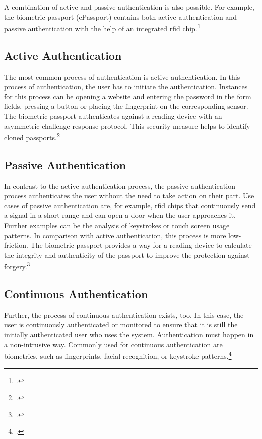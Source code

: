 A combination of active and passive authentication is also possible. For example, the biometric passport (\frqq ePassport\flqq) contains both active authentication and passive authentication with the help of an integrated \gls{rfid} chip.\footcite[See][545]{eckert-it-sec-9}


\subsection{Active Authentication}
\label{subsec:active_auth}

The most common process of authentication is active authentication. In this process of authentication, the user has to initiate the authentication. Instances for this process can be opening a website and entering the password in the form fields, pressing a button or placing the fingerprint on the corresponding sensor. The biometric passport authenticates against a reading device with an asymmetric challenge-response protocol. This security measure helps to identify cloned passports.\footcites[See][185--186]{10.1007/978-3-319-05452-0_14} [See][545]{eckert-it-sec-9}

\subsection{Passive Authentication}

In contrast to the active authentication process, the passive authentication process authenticates the user without the need to take action on their part. Use cases of passive authentication are, for example, \gls{rfid} chips that continuously send a signal in a short-range and can open a door when the user approaches it. Further examples can be the analysis of keystrokes or touch screen usage patterns. In comparison with active authentication, this process is more low-friction. The biometric passport provides a way for a reading device to calculate the integrity and authenticity of the passport to improve the protection against forgery.\footcites[See][186]{10.1007/978-3-319-05452-0_14}[See][]{185306}[See][545]{eckert-it-sec-9}

\subsection{Continuous Authentication}

Further, the process of continuous authentication exists, too. In this case, the user is continuously authenticated or monitored to ensure that it is still the initially authenticated user who uses the system. Authentication must happen in a non-intrusive way. Commonly used for continuous authentication are biometrics, such as fingerprints, facial recognition, or keystroke patterns.\footcites[See][236--238]{dasgupta2017multi}[See][]{7444124}

